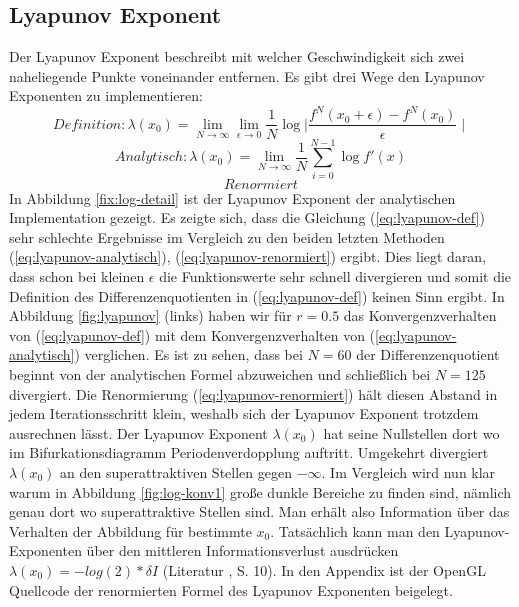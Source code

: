 \documentclass[12pt,a4paper]{article}
\begin{document}
\subsection{Lyapunov Exponent}
Der Lyapunov Exponent beschreibt mit welcher Geschwindigkeit sich zwei naheliegende Punkte voneinander entfernen. 
Es gibt drei Wege den Lyapunov Exponenten zu implementieren:
\begin{equation}
Definition: \lambda(x_0) = \lim_{N \rightarrow \infty}\lim_{\epsilon \rightarrow 0} \frac{1}{N}\log{\mid \frac{f^N(x_0+\epsilon)- f^N(x_0)}{\epsilon} \mid} 
\label{eq:lyapunov-def}
\end{equation}
\begin{equation}
Analytisch: \lambda(x_0) = \lim_{N \rightarrow \infty} \frac{1}{N} \sum_{i=0}^{N-1}  \log{f'(x)} 
\label{eq:lyapunov-analytisch}
\end{equation}
\begin{equation}
Renormiert
\label{eq:lyapunov-renormiert}
\end{equation}
In Abbildung \ref{fix:log-detail} ist der Lyapunov Exponent der analytischen Implementation gezeigt.
Es zeigte sich, dass die Gleichung (\ref{eq:lyapunov-def}) sehr schlechte Ergebnisse im Vergleich zu den beiden letzten Methoden (\ref{eq:lyapunov-analytisch}), (\ref{eq:lyapunov-renormiert}) ergibt.
Dies liegt daran, dass schon bei kleinen $\epsilon$ die Funktionswerte sehr schnell divergieren und somit die Definition des Differenzenquotienten in (\ref{eq:lyapunov-def}) keinen Sinn ergibt.
In Abbildung \ref{fig:lyapunov} (links) haben wir für $r=0.5$ das Konvergenzverhalten von (\ref{eq:lyapunov-def}) mit dem Konvergenzverhalten von (\ref{eq:lyapunov-analytisch}) verglichen. Es ist zu sehen, dass bei $N=60$ der Differenzenquotient beginnt von der analytischen Formel abzuweichen und schließlich bei $N=125$ divergiert.
Die Renormierung (\ref{eq:lyapunov-renormiert}) hält diesen Abstand in jedem Iterationsschritt klein, weshalb sich der Lyapunov Exponent trotzdem ausrechnen lässt.
Der Lyapunov Exponent $\lambda(x_0)$ hat seine Nullstellen dort wo im Bifurkationsdiagramm Periodenverdopplung auftritt. Umgekehrt divergiert $\lambda(x_0)$ an den superattraktiven Stellen gegen $-\infty$.
Im Vergleich wird nun klar warum in Abbildung \ref{fig:log-konv1} große dunkle Bereiche zu finden sind, nämlich genau dort wo superattraktive Stellen sind. 
Man erhält also Information über das Verhalten der Abbildung für bestimmte $x_0$.
Tatsächlich kann man den Lyapunov-Exponenten über den mittleren Informationsverlust ausdrücken $\lambda(x_0)=-log(2)*\delta I$ (Literatur \parencite{versuchmappe}, S. 10).
In den Appendix ist der OpenGL Quellcode der renormierten Formel des Lyapunov Exponenten beigelegt.
\end{document}
